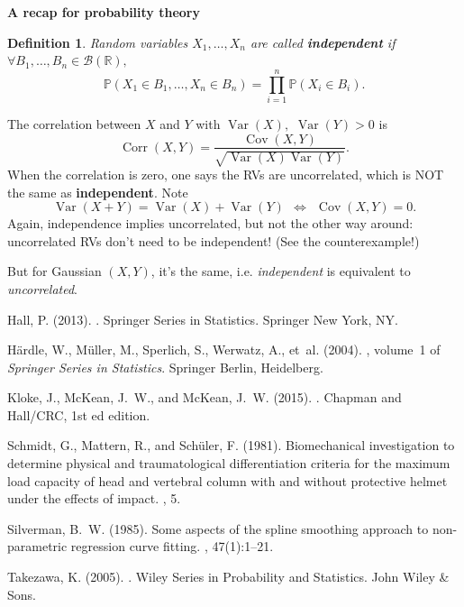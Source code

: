 \documentclass[19pt,landscaoe]{article}
\newtheorem{defi}[thm]{Definition}
\newcommand{\IP}{\mathbb{P}}
\newcommand{\R}{\mathbb{R}}
\DeclareMathOperator{\Var}{\mathrm{Var}}
\DeclareMathOperator{\var}{\mathrm{Var}}
\DeclareMathOperator{\cov}{\mathrm{Cov}}
\DeclareMathOperator{\corr}{\mathrm{Corr}}
\begin{document}
\newpage
{\LARGE\centerline{\textbf{A recap for probability theory}}}
\vskip25pt
\begin{minipage}{.9\textwidth}
   \large
\begin{defi}
    Random variables $X_1,\dots,X_n$ are called {\bf independent} if ~$\forall B_1,\dots,B_n\in\mathcal{B}(\R),$
    $$\IP(X_1\in B_1,\dots,X_n\in B_n)=\prod_{i=1}^n\IP(X_i\in B_i).$$
\end{defi}
   The correlation between $X$ and $Y$ with $\Var(X),$ $\Var(Y)>0$ is 
   $$\corr(X,Y)=\frac{\cov(X,Y)}{\sqrt{\var(X)\var(Y)}}.$$
   When the correlation is zero, one says the RVs are uncorrelated, which is NOT the same as {\bf independent}. Note 
   $$\Var(X+Y)=\Var(X)+\Var(Y)~~\Leftrightarrow~~\cov(X,Y)=0.$$
 Again, independence implies uncorrelated, but not the other way around: uncorrelated RVs don't need to be independent! (See the counterexample!)
   
   \vskip 5pt
   But for Gaussian $(X,Y)$, it's the same, i.e. {\it independent} is equivalent to {\it uncorrelated}. 
\end{minipage}







\newpage

% 
\begin{thebibliography}{}

    Hall, P. (2013).
    .
    \newblock Springer Series in Statistics. Springer New York, NY.
    
    H{\"a}rdle, W., M{\"u}ller, M., Sperlich, S., Werwatz, A., et~al. (2004).
    , volume~1 of {\em Springer Series in Statistics}.
    \newblock Springer Berlin, Heidelberg.
    
    Kloke, J., McKean, J.~W., and McKean, J.~W. (2015).
    .
    \newblock Chapman and Hall/CRC, 1st ed edition.
    
    Schmidt, G., Mattern, R., and Sch{\"u}ler, F. (1981).
    \newblock Biomechanical investigation to determine physical and traumatological differentiation criteria for the maximum load capacity of head and vertebral column with and without protective helmet under the effects of impact.
    , 5.
    
    Silverman, B.~W. (1985).
    \newblock Some aspects of the spline smoothing approach to non-parametric regression curve fitting.
    , 47(1):1--21.
    
    Takezawa, K. (2005).
    .
    \newblock Wiley Series in Probability and Statistics. John Wiley \& Sons.
    
    \end{thebibliography}
\end{document}
